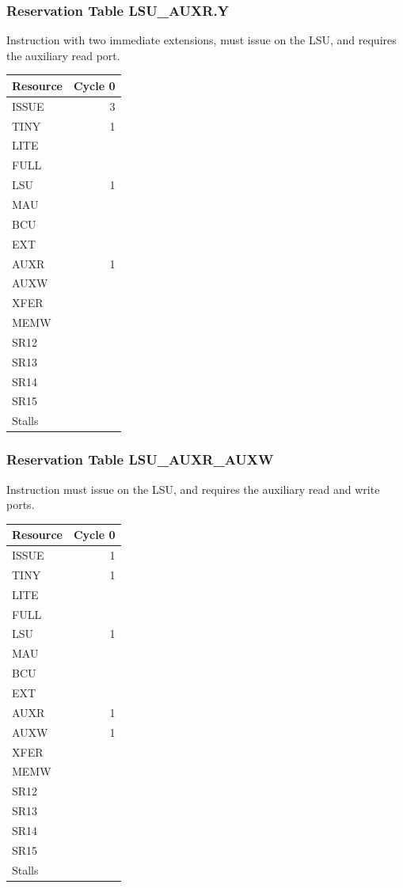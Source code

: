 \subsubsection{Reservation Table LSU\_AUXR.Y} \label{sec:reservation-LSU-AUXR.Y}

Instruction with two immediate extensions, must issue on the LSU, and requires the auxiliary read port.
\medskip

\begin{tabular}{|l|r|} \hline
Resource	& Cycle 0 \\ \hline
\textsf{ISSUE}	& 3	\\
\textsf{TINY}	& 1	\\
\textsf{LITE}	& 	\\
\textsf{FULL}	& 	\\
\textsf{LSU}	& 1	\\
\textsf{MAU}	& 	\\
\textsf{BCU}	& 	\\
\textsf{EXT}	& 	\\
\textsf{AUXR}	& 1	\\
\textsf{AUXW}	& 	\\
\textsf{XFER}	& 	\\
\textsf{MEMW}	& 	\\
\textsf{SR12}	& 	\\
\textsf{SR13}	& 	\\
\textsf{SR14}	& 	\\
\textsf{SR15}	& 	\\
\hline Stalls	& 	\\
\hline \end{tabular}

\subsubsection{Reservation Table LSU\_AUXR\_AUXW} \label{sec:reservation-LSU-AUXR-AUXW}

Instruction must issue on the LSU, and requires the auxiliary read and write ports.
\medskip

\begin{tabular}{|l|r|} \hline
Resource	& Cycle 0 \\ \hline
\textsf{ISSUE}	& 1	\\
\textsf{TINY}	& 1	\\
\textsf{LITE}	& 	\\
\textsf{FULL}	& 	\\
\textsf{LSU}	& 1	\\
\textsf{MAU}	& 	\\
\textsf{BCU}	& 	\\
\textsf{EXT}	& 	\\
\textsf{AUXR}	& 1	\\
\textsf{AUXW}	& 1	\\
\textsf{XFER}	& 	\\
\textsf{MEMW}	& 	\\
\textsf{SR12}	& 	\\
\textsf{SR13}	& 	\\
\textsf{SR14}	& 	\\
\textsf{SR15}	& 	\\
\hline Stalls	& 	\\
\hline \end{tabular}

